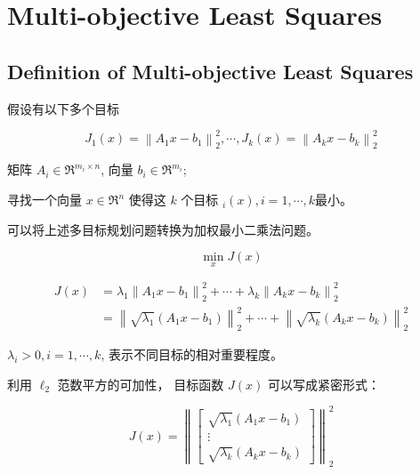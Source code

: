 \chapter{Multi-objective Least Squares}

\section{Definition of Multi-objective Least Squares}

\begin{problem}
    假设有以下多个目标

\begin{equation}
J_{1}(x)=\left\|A_{1} x-b_{1}\right\|_{2}^{2}, \cdots, J_{k}(x)=\left\|A_{k} x-b_{k}\right\|_{2}^{2}
\end{equation}

矩阵 $ A_{i} \in \mathfrak{R}^{m_{i} \times n} $, 向量 $ b_{i} \in \mathfrak{R}^{m_{i}} $;

寻找一个向量 $ x \in \mathfrak{R}^{n} $ 使得这 $ k $ 个目标 $ _{i}(x), i=1, \cdots, k $最小。
\end{problem}

可以将上述多目标规划问题转换为加权最小二乘法问题。

\begin{problem}[加权最小二乘法问题]
    \begin{equation} 
    \min _{x} J(x)
\end{equation}

\begin{equation}\begin{aligned}
    J(x)&=\lambda_{1}\left\|A_{1} x-b_{1}\right\|_{2}^{2}+\cdots+\lambda_{k}\left\|A_{k} x-b_{k}\right\|_{2}^{2} \\
    &=\left\|\sqrt{\lambda_{1}}\left(A_{1} x-b_{1}\right)\right\|_{2}^{2}+\cdots+\left\|\sqrt{\lambda_{k}}\left(A_{k} x-b_{k}\right)\right\|_{2}^{2}
    \end{aligned}\end{equation}

$ \lambda_{i}>0, i=1, \cdots, k $, 表示不同目标的相对重要程度。
\end{problem}

利用 $ \ell_{2} $ 范数平方的可加性， 目标函数 $ J(x) $ 可以写成紧密形式：

\begin{problem}[加权最小二乘法问题紧密形式]
    \begin{equation}
J(x)=\left\|\left[\begin{array}{c}
\sqrt{\lambda_{1}}\left(A_{1} x-b_{1}\right) \\
\vdots \\
\sqrt{\lambda_{k}}\left(A_{k} x-b_{k}\right)
\end{array}\right]\right\|_{2}^{2}
\end{equation}
\end{problem}



